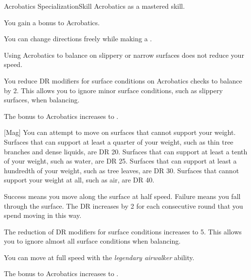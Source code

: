     \begin{feat}{Acrobatics Specialization}{Skill}
        \featpre Acrobatics as a mastered skill.

         You gain a  bonus to Acrobatics.

         You can change directions freely while making a .

         Using Acrobatics to balance on slippery or narrow surfaces does not reduce your speed.

         You reduce DR modifiers for surface conditions on Acrobatics checks to balance by 2.
        This allows you to ignore minor surface conditions, such as slippery surfaces, when balancing.

         The bonus to Acrobatics increases to .

        [Mag] You can attempt to move on surfaces that cannot support your weight.
        Surfaces that can support at least a quarter of your weight, such as thin tree branches and dense liquids, are DR 20.
        Surfaces that can support at least a tenth of your weight, such as water, are DR 25.
        Surfaces that can support at least a hundredth of your weight, such as tree leaves, are DR 30.
        Surfaces that cannot support your weight at all, such as air, are DR 40.

        Success means you move along the surface at half speed.
        Failure means you fall through the surface.
        The DR increases by 2 for each consecutive round that you spend moving in this way.

         The reduction of DR modifiers for surface conditions increases to 5.
        This allows you to ignore almost all surface conditions when balancing.

         You can move at full speed with the \textit{legendary airwalker} ability.

         The bonus to Acrobatics increases to .

        \ff[18]{} 
    \end{feat}

